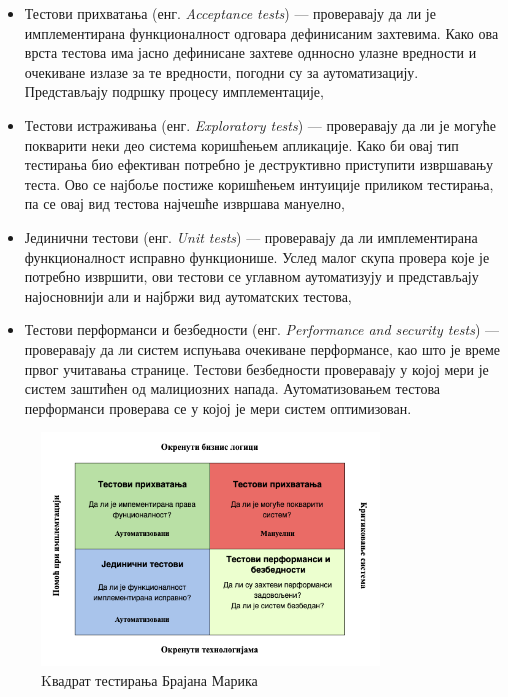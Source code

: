 \documentclass[12pt,oneside]{memoir}
\begin{document}
\begin{itemize}
\item Тестови прихватања (енг. \textit{Acceptance tests}) --- проверавају да ли је имплементирана функционалност  одговара дефинисаним захтевима. Како ова врста тестова има јасно дефинисане захтеве однносно улазне вредности и очекиване излазе за те вредности, погодни су за аутоматизацију. Представљају подршку процесу имплементације,
\item Тестови истраживања (енг. \textit{Exploratory tests}) --- проверавају да ли је могуће покварити неки део система коришћењем апликације. Како би овај тип тестирања био ефективан потребно је деструктивно приступити извршавању теста. Ово се најбоље постиже коришћењем интуиције приликом тестирања, па се овај вид тестова најчешће извршава мануелно,
\item Јединични тестови (енг. \textit{Unit tests}) --- проверавају да ли имплементирана функционалност исправно функционише. Услед малог скупа провера које је потребно извршити, ови тестови се углавном аутоматизују и представљају најосновнији али и најбржи вид аутоматских тестова,
\item Тестови перформанси и безбедности (енг. \textit{Performance and security tests})  --- проверавају да ли систем испуњава очекиване перформансе, као што је време првог учитавања странице. Тестови безбедности проверавају у којој мери је систем заштићен од малициозних напада. Аутоматизовањем тестова перформанси проверава се у којој је мери систем оптимизован.
\end{itemize}



\begin{figure}[!ht]
  \centering
  \includegraphics[width=0.8\textwidth]{matfmaster/img/kvadrat.png}
  \caption{Kвадрат тестирања Брајана Марика}
  \label{fig:kvadrat}
\end{figure}
\end{document}
